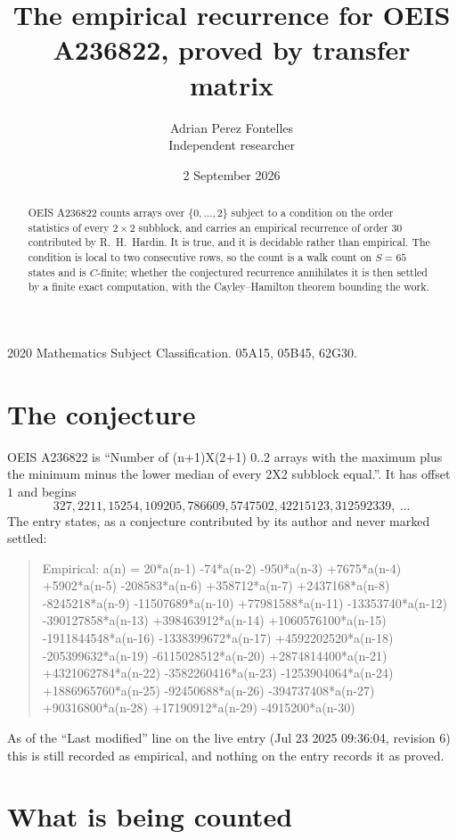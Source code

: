 \documentclass[11pt,a4paper]{article}
\title{The empirical recurrence for OEIS A236822, proved by transfer matrix}
\author{Adrian Perez Fontelles\\ \small Independent researcher}
\date{2 September 2026}
\theoremstyle{plain}
\theoremstyle{definition}
\begin{document}
\maketitle

\begin{abstract}
OEIS A236822 counts arrays over $\{0,\dots,2\}$ subject to a condition on the order
statistics of every $2\times2$ subblock, and carries an empirical recurrence of order
$30$ contributed by R.~H.~Hardin. It is true, and it is decidable rather than empirical.
The condition is local to two consecutive rows, so the count is a walk count on $S=65$
states and is $C$-finite; whether the conjectured recurrence annihilates it is then settled by
a finite exact computation, with the Cayley--Hamilton theorem bounding the work.
\end{abstract}

\noindent\small 2020 Mathematics Subject Classification. 05A15, 05B45, 62G30.\normalsize

\section{The conjecture}

OEIS A236822 is ``Number of (n+1)X(2+1) 0..2 arrays with the maximum plus the minimum minus the lower median of every 2X2 subblock equal.''. It has offset $1$ and begins
\[
327, 2211, 15254, 109205, 786609, 5747502, 42215123, 312592339,\ \dots
\]
The entry states, as a conjecture contributed by its author and never marked settled:
\begin{quote}
Empirical: a(n) = 20*a(n-1) -74*a(n-2) -950*a(n-3) +7675*a(n-4) +5902*a(n-5) -208583*a(n-6) +358712*a(n-7) +2437168*a(n-8) -8245218*a(n-9) -11507689*a(n-10) +77981588*a(n-11) -13353740*a(n-12) -390127858*a(n-13) +398463912*a(n-14) +1060576100*a(n-15) -1911844548*a(n-16) -1338399672*a(n-17) +4592202520*a(n-18) -205399632*a(n-19) -6115028512*a(n-20) +2874814400*a(n-21) +4321062784*a(n-22) -3582260416*a(n-23) -1253904064*a(n-24) +1886965760*a(n-25) -92450688*a(n-26) -394737408*a(n-27) +90316800*a(n-28) +17190912*a(n-29) -4915200*a(n-30)
\end{quote}
As of the ``Last modified'' line on the live entry (Jul 23 2025 09:36:04, revision 6) this is still
recorded as empirical, and nothing on the entry records it as proved.

\section{What is being counted}
\end{document}
